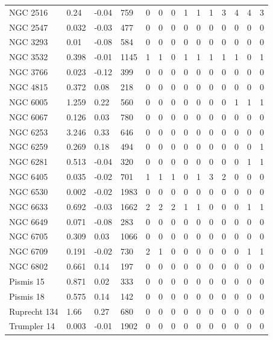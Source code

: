 \begin{longtable}[c]{|l l l l || c c c c c c c c c c|}
		\rowcolor{lightgray}
		NGC 2516 & 0.24 & -0.04 & 759 & 0 & 0 & 0 & 1 & 1 & 1 & 3 & 4 & 4 & 3\\
		NGC 2547 & 0.032 & -0.03 & 477 & 0 & 0 & 0 & 0 & 0 & 0 & 0 & 0 & 0 & 0\\
		NGC 3293 & 0.01 & -0.08 & 584 & 0 & 0 & 0 & 0 & 0 & 0 & 0 & 0 & 0 & 0\\
		\rowcolor{lightgray}
		NGC 3532 & 0.398 & -0.01 & 1145 & 1 & 1 & 0 & 1 & 1 & 1 & 1 & 1 & 0 & 1\\
		NGC 3766 & 0.023 & -0.12 & 399 & 0 & 0 & 0 & 0 & 0 & 0 & 0 & 0 & 0 & 0\\
		NGC 4815 & 0.372 & 0.08 & 218 & 0 & 0 & 0 & 0 & 0 & 0 & 0 & 0 & 0 & 0\\
		\rowcolor{lightgray}
		NGC 6005 & 1.259 & 0.22 & 560 & 0 & 0 & 0 & 0 & 0 & 0 & 0 & 1 & 1 & 1\\
		NGC 6067 & 0.126 & 0.03 & 780 & 0 & 0 & 0 & 0 & 0 & 0 & 0 & 0 & 0 & 0\\
		NGC 6253 & 3.246 & 0.33 & 646 & 0 & 0 & 0 & 0 & 0 & 0 & 0 & 0 & 0 & 0\\
		\rowcolor{lightgray}
		NGC 6259 & 0.269 & 0.18 & 494 & 0 & 0 & 0 & 0 & 0 & 0 & 0 & 0 & 0 & 1\\
		\rowcolor{lightgray}
		NGC 6281 & 0.513 & -0.04 & 320 & 0 & 0 & 0 & 0 & 0 & 0 & 0 & 0 & 1 & 1\\
		\rowcolor{lightgray}
		NGC 6405 & 0.035 & -0.02 & 701 & 1 & 1 & 1 & 0 & 1 & 3 & 2 & 0 & 0 & 0\\
		NGC 6530 & 0.002 & -0.02 & 1983 & 0 & 0 & 0 & 0 & 0 & 0 & 0 & 0 & 0 & 0\\
		\rowcolor{lightgray}
		NGC 6633 & 0.692 & -0.03 & 1662 & 2 & 2 & 2 & 1 & 1 & 0 & 0 & 0 & 1 & 1\\
		NGC 6649 & 0.071 & -0.08 & 283 & 0 & 0 & 0 & 0 & 0 & 0 & 0 & 0 & 0 & 0\\
		NGC 6705 & 0.309 & 0.03 & 1066 & 0 & 0 & 0 & 0 & 0 & 0 & 0 & 0 & 0 & 0\\
		\rowcolor{lightgray}
		NGC 6709 & 0.191 & -0.02 & 730 & 2 & 1 & 0 & 0 & 0 & 0 & 0 & 0 & 1 & 1\\
		NGC 6802 & 0.661 & 0.14 & 197 & 0 & 0 & 0 & 0 & 0 & 0 & 0 & 0 & 0 & 0\\
		Pismis 15 & 0.871 & 0.02 & 333 & 0 & 0 & 0 & 0 & 0 & 0 & 0 & 0 & 0 & 0\\
		Pismis 18 & 0.575 & 0.14 & 142 & 0 & 0 & 0 & 0 & 0 & 0 & 0 & 0 & 0 & 0\\
		Ruprecht 134 & 1.66 & 0.27 & 680 & 0 & 0 & 0 & 0 & 0 & 0 & 0 & 0 & 0 & 0\\
		Trumpler 14 & 0.003 & -0.01 & 1902 & 0 & 0 & 0 & 0 & 0 & 0 & 0 & 0 & 0 & 0\\

\end{longtable}
